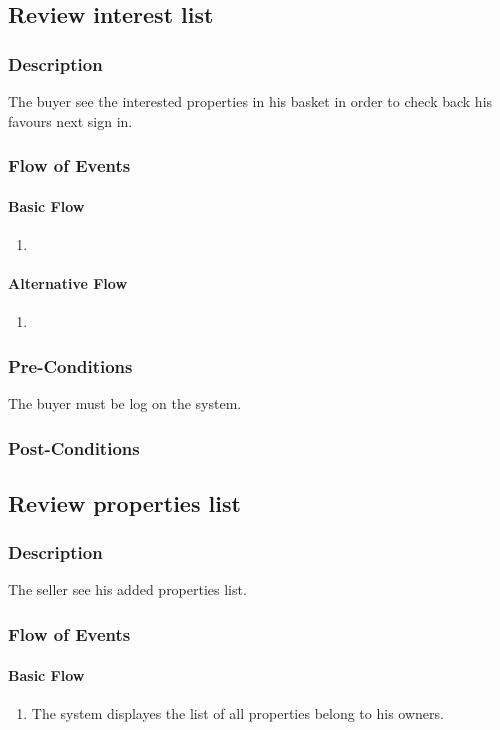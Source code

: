 \documentclass[a4paper,12pt]{article}
\begin{document}
\subsection{Review interest list}
\subsubsection{Description}
The buyer see the interested properties in his basket in order to check back his favours next sign in.
\subsubsection{Flow of Events}
\paragraph{Basic Flow}
\begin{enumerate}
\item
\end{enumerate}
\paragraph{Alternative Flow}
\begin{enumerate}
\item
\end{enumerate}
\subsubsection{Pre-Conditions}
The buyer must be log on the system.
\subsubsection{Post-Conditions}

\subsection{Review properties list}
\subsubsection{Description}
The seller see his added properties list.
\subsubsection{Flow of Events}
\paragraph{Basic Flow}
\begin{enumerate}
\item The system displayes the list of all properties belong to his owners.
\end{enumerate}
\end{document}
